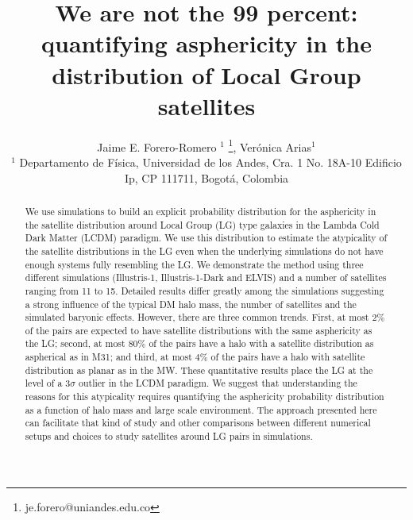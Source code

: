 \documentclass[a4paper,fleqn,usenatbib]{mnras}
\begin{document}
\title[LG satellites distribution asphericity]{We are not the 99 percent: quantifying
  asphericity in the distribution of Local Group satellites}
\author[J.E. Forero-Romero \& V. Arias]
{Jaime E. Forero-Romero $^{1}$ \thanks{je.forero@uniandes.edu.co},
Ver\'onica Arias$^1$\\
$^1$ Departamento de F\'isica, Universidad de los Andes, Cra. 1
  No. 18A-10 Edificio Ip, CP 111711, Bogot\'a, Colombia \\
}

\maketitle

\begin{abstract}
We use simulations to build an explicit probability distribution for
the asphericity in the satellite distribution around Local Group (LG)
type galaxies in the Lambda Cold Dark Matter (LCDM) paradigm. 
We use this distribution to estimate the  atypicality
of the satellite distributions in the LG even when the underlying
simulations do not have enough systems fully resembling the LG.
We demonstrate the method using three different simulations
(Illustris-1,  Illustris-1-Dark and ELVIS) and a number of satellites
ranging from 11 to 15.
Detailed results differ greatly among the simulations suggesting a
strong influence of the typical DM halo mass, the number of satellites
and the simulated baryonic effects.   
However, there are three common trends.
First, at most $2\%$ of the pairs are expected to have satellite
distributions with the same asphericity as the LG; second,
at most $80\%$ of the pairs have a halo with a satellite
distribution as aspherical as in M31; and third, at most $4\%$ of the
pairs have a halo with satellite distribution as planar as in the MW. 
These quantitative results place the LG at the level of a $3\sigma$
outlier in the LCDM paradigm. 
We suggest that understanding the reasons for this atypicality
requires quantifying the asphericity probability distribution as a
function of halo mass and large scale environment.
The approach presented here can facilitate that kind of study and other
comparisons between different numerical setups and choices to study
satellites around LG pairs in simulations.  
\end{abstract}
\end{document}
